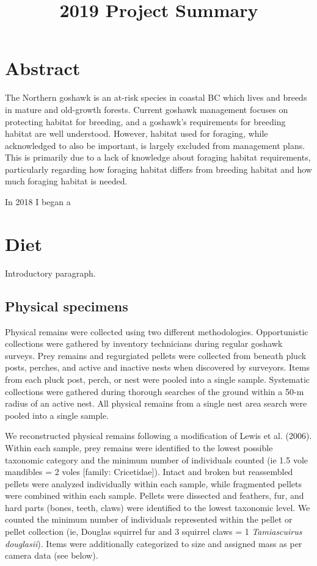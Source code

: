 \documentclass[]{article}
\title{2019 Project Summary}
\author{}
\date{\vspace{-2.5em}}
\begin{document}
\maketitle

\section{Abstract}\label{abstract}

The Northern goshawk is an at-risk species in coastal BC which lives and
breeds in mature and old-growth forests. Current goshawk management
focuses on protecting habitat for breeding, and a goshawk's requirements
for breeding habitat are well understood. However, habitat used for
foraging, while acknowledged to also be important, is largely excluded
from management plans. This is primarily due to a lack of knowledge
about foraging habitat requirements, particularly regarding how foraging
habitat differs from breeding habitat and how much foraging habitat is
needed.

In 2018 I began a

\section{Diet}\label{diet}

Introductory paragraph.

\subsection{Physical specimens}\label{physical-specimens}

Physical remains were collected using two different methodologies.
Opportunistic collections were gathered by inventory technicians during
regular goshawk surveys. Prey remains and regurgiated pellets were
collected from beneath pluck posts, perches, and active and inactive
nests when discovered by surveyors. Items from each pluck post, perch,
or nest were pooled into a single sample. Systematic collections were
gathered during thorough searches of the ground within a 50-m radius of
an active nest. All physical remains from a single nest area search were
pooled into a single sample.

We reconstructed physical remains following a modification of Lewis et
al. (2006). Within each sample, prey remains were identified to the
lowest possible taxonomic category and the minimum number of individuals
counted (ie 1.5 vole mandibles = 2 voles {[}family: Cricetidae{]}).
Intact and broken but reassembled pellets were analyzed individually
within each sample, while fragmented pellets were combined within each
sample. Pellets were dissected and feathers, fur, and hard parts (bones,
teeth, claws) were identified to the lowest taxonomic level. We counted
the minimum number of individuals represented within the pellet or
pellet collection (ie, Douglas squirrel fur and 3 squirrel claws = 1
\emph{Tamiascuirus douglasii}). Items were additionally categorized to
size and assigned mass as per camera data (see below).
\end{document}
